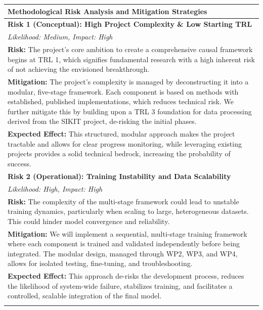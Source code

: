\documentclass[11pt, a4paper]{article}
\begin{document}
\begin{longtable}{p{}}
\toprule
\textbf{Methodological Risk Analysis and Mitigation Strategies} \\
\midrule
\endfirsthead
\endhead

\textbf{Risk 1 (Conceptual): High Project Complexity \& Low Starting TRL} \\
\textit{Likelihood: Medium, Impact: High}\\
\textbf{Risk:} The project's core ambition to create a comprehensive causal framework begins at TRL 1, which signifies fundamental research with a high inherent risk of not achieving the envisioned breakthrough. \\
\textbf{Mitigation:} The project's complexity is managed by deconstructing it into a modular, five-stage framework. Each component is based on methods with established, published implementations, which reduces technical risk. We further mitigate this by building upon a TRL 3 foundation for data processing derived from the SIKIT project, de-risking the initial phases.\\
\textbf{Expected Effect:} This structured, modular approach makes the project tractable and allows for clear progress monitoring, while leveraging existing projects provides a solid technical bedrock, increasing the probability of success. \\
\addlinespace

\textbf{Risk 2 (Operational): Training Instability and Data Scalability} \\
\textit{Likelihood: High, Impact: High} \\
\textbf{Risk:} The complexity of the multi-stage framework could lead to unstable training dynamics, particularly when scaling to large, heterogeneous datasets. This could hinder model convergence and reliability. \\
\textbf{Mitigation:} We will implement a sequential, multi-stage training framework where each component is trained and validated independently before being integrated. The modular design, managed through WP2, WP3, and WP4, allows for isolated testing, fine-tuning, and troubleshooting. \\
\textbf{Expected Effect:} This approach de-risks the development process, reduces the likelihood of system-wide failure, stabilizes training, and facilitates a controlled, scalable integration of the final model. \\
\addlinespace


\end{longtable}
\end{document}
